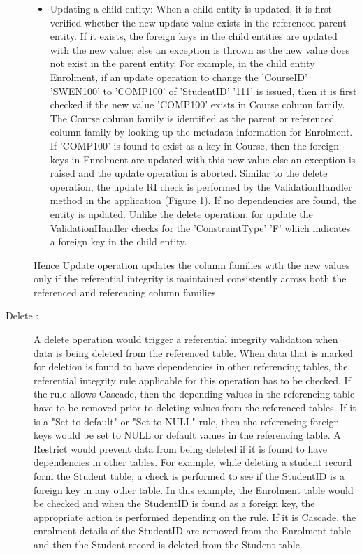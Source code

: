 \begin{description}
\begin{itemize}
\item Updating a child entity: When a child entity is updated, it is first
verified whether the new update value exists in the referenced parent entity. If it
exists, the foreign keys in the child entities are updated with the new value;
else an exception is thrown as the new value does not exist in the parent
entity. For example, in the child entity Enrolment, if an update operation to
change the 'CourseID' 'SWEN100' to 'COMP100' of 'StudentID' '111' is issued,
then it is first checked if the new value 'COMP100' exists in Course column
family. The Course column family is identified as the parent or referenced
column family by looking up the metadata information for Enrolment. If 'COMP100'
is found to exist as a key in Course, then the foreign keys in Enrolment are
updated with this new value else an exception is raised and the update operation
is aborted.
Similar to the delete operation, the update RI check is performed by the
ValidationHandler method in the application (Figure 1). If no dependencies are
found, the entity is updated. Unlike the delete operation, for update the
ValidationHandler checks for the 'ConstraintType' 'F' which indicates a foreign
key in the child entity.
\end {itemize}
Hence Update operation updates the column families with the new values only if
the referential integrity is maintained consistently across both the referenced
and referencing column families.


\item  [Delete :] A delete operation would trigger a referential integrity
validation when data is being deleted from the referenced table. When data that is marked
for deletion is found to have dependencies in other referencing tables, the
referential integrity rule applicable for this operation has to be checked. If
the rule allows Cascade, then the depending values in the referencing table have
to be removed prior to deleting values from the referenced tables. If it is a
"Set to default" or "Set to NULL" rule, then the referencing foreign keys would
be set to NULL or default values in the referencing table. A Restrict would
prevent data from being deleted if it is found to have dependencies in other
tables. For example, while deleting a student record form the Student table, a
check is performed to see if the StudentID is a foreign key in any other table.
In this example, the Enrolment table would be checked and when the StudentID is
found as a foreign key, the appropriate action is performed depending on the
rule. If it is Cascade, the enrolment details of the StudentID are removed from
the Enrolment table and then the Student record is deleted from the Student
table.


\end{description}
